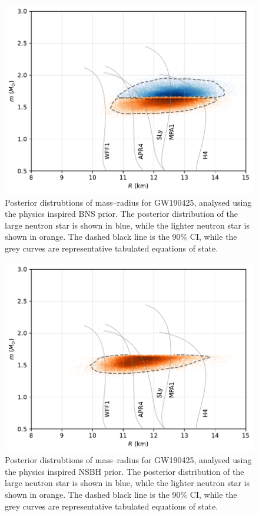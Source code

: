 \documentclass[twocolumn]{aastex631}
\begin{document}
\begin{figure}
	\centering
	\includegraphics[width=\linewidth]{GW190425_mass_radius_universalrel.pdf}
	\caption{ Posterior distrubtions of mass--radius for GW190425, analysed using the physics inspired BNS prior. The posterior distribution of the large neutron star is shown in blue, while the lighter neutron star is shown in orange. The dashed black line is the 90\% CI, while the grey curves are representative tabulated equations of state.}	
	\label{fig:GW190425_massradius_BNS}
\end{figure}
\begin{figure}
	\centering
	\includegraphics[width=\linewidth]{GW190425_mass_radius_universalrel_NSBH.pdf}
	\caption{Posterior distrubtions of mass--radius for GW190425, analysed using the physics inspired NSBH prior. The posterior distribution of the large neutron star is shown in blue, while the lighter neutron star is shown in orange. The dashed black line is the 90\% CI, while the grey curves are representative tabulated equations of state.}	
	\label{fig:GW190425_massradius_NSBH}
\end{figure}
\end{document}
